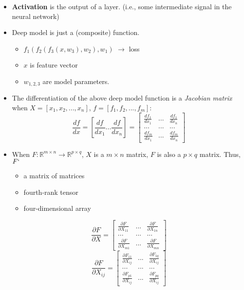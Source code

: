 \documentclass[]{article}
\begin{document}
\begin{itemize}
	\item \textbf{Activation} is the output of a layer. (i.e., some intermediate signal in the neural network)
	
	\item Deep model is just a (composite) function.
	\begin{itemize}
		\item $f_1(f_2(f_3(x,w_3),w_2),w_1)$ $\rightarrow$ loss
		\item $x$ is feature vector
		\item $w_{1,2,3}$ are model parameters. 
	\end{itemize}

	\item The differentiation of the above deep model function is a \textit{Jacobian matrix} when $X=[x_1,x_2,...,x_n]$, $f=[f_1,f_2,...,f_m]$:
	\begin{equation}
	\frac{df}{dx}=\left[\frac{df}{dx_1}...\frac{df}{dx_n}\right]=\left[\begin{array}{ccc}
	\frac{df_1}{dx_1}&...&\frac{df_1}{dx_n}\\
	...&...&...\\
	\frac{df_m}{dx_1}&...&\frac{df_m}{dx_n}
	\end{array}\right]
	\end{equation}
	
	\item When $F:\mathbb{R}^{m\times n}\rightarrow \mathbb{R}^{p\times q}$, $X$ is a $m\times n$ matrix, $F$ is also a $p\times q$ matrix. Thus, $F`$ 
	\begin{itemize}
		\item a matrix of matrices
		\item fourth-rank tensor
		\item four-dimensional array
	\end{itemize} 
	\begin{equation}
	\frac{\partial F}{\partial X}=\left[\begin{array}{ccc}
	\frac{\partial F}{\partial X_{11}}&...&\frac{\partial F}{\partial X_{1n}}\\
	...&...&...\\
	\frac{\partial F}{\partial X_{m1}}&...&\frac{\partial F}{\partial X_{mn}}
	\end{array}\right]
	\end{equation}
	\begin{equation}
	\frac{\partial F}{\partial X_{ij}}=\left[\begin{array}{ccc}
	\frac{\partial F_{11}}{\partial X_{ij}}&...&\frac{\partial F_{1q}}{\partial X_{ij}}\\
	...&...&...\\
	\frac{\partial F_{p1}}{\partial X_{ij}}&...&\frac{\partial F_{pq}}{\partial X_{ij}}
	\end{array}\right]
	\end{equation}
\end{itemize}
\end{document}
